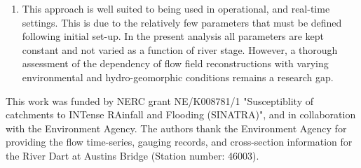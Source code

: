 \documentclass[hess, manuscript]{copernicus} %
\begin{document}
\begin{enumerate}
    \item This approach is well suited to being used in operational, and real-time settings. This is due to the relatively few parameters that must be defined following initial set-up. In the present analysis all parameters are kept constant and not varied as a function of river stage. However, a thorough assessment of the dependency of flow field reconstructions with varying environmental and hydro-geomorphic conditions remains a research gap. 
\end{enumerate}





\begin{acknowledgements}
This work was funded by NERC grant NE/K008781/1 "Susceptiblity of catchments to INTense RAinfall and Flooding (SINATRA)", and in collaboration with the Environment Agency. The authors thank the Environment Agency for providing the flow time-series, gauging records, and cross-section information for the River Dart at Austins Bridge (Station number: 46003).
\end{acknowledgements}







\end{document}
